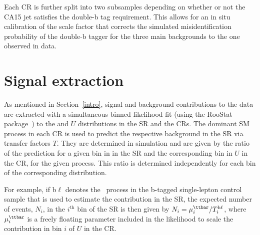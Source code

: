 
Each CR is further split into two subsamples depending on whether or not the CA15 jet satisfies the double-b tag requirement. This allows for an in situ calibration of the scale factor that corrects the simulated misidentification probability of the double-b tagger for the three main backgrounds to the one observed in data. 

\section{Signal extraction}

As mentioned in Section~\ref{intro}, signal and background contributions to the data are extracted with a simultaneous binned likelihood fit (using the {\sc RooStat} package~\cite{roostats}) to the \MET and $U$ distributions in the SR and the CRs.
%
The dominant SM process in each CR is used to predict the respective background in the SR via transfer factors $T$. They are determined in simulation and are given by the ratio of the prediction for a given bin in \ptmiss in the SR and the corresponding bin in $U$ in the CR, for the given process. This ratio is determined independently for each bin of the corresponding distribution.
  
For example, if b$\ell$ denotes the \ttbar~process in the b-tagged single-lepton control sample that is used to estimate the \ttbar contribution in the SR, the expected number of \ttbar events, $N_{i}$, in the $i^\text{th}$ bin of the SR is then given by $N_{i}= \mu^{\ttbar}_{i}/T^{\mathrm{b}\ell}_{i}$, where  $\mu^{\ttbar}_i$ is a freely floating parameter included in the likelihood to scale the \ttbar contribution in bin $i$ of $U$ in the CR.


